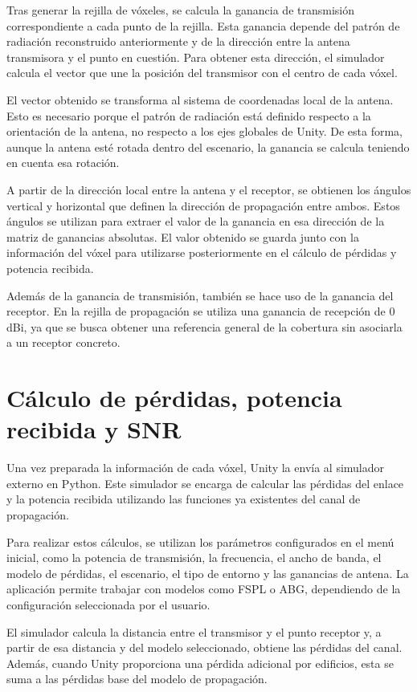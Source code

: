 Tras generar la rejilla de vóxeles, se calcula la ganancia de transmisión correspondiente a cada punto de la rejilla. Esta ganancia depende del patrón de radiación reconstruido anteriormente y de la dirección entre la antena transmisora y el punto en cuestión. Para obtener esta dirección, el simulador calcula el vector que une la posición del transmisor con el centro de cada vóxel.

El vector obtenido se transforma al sistema de coordenadas local de la antena. Esto es necesario porque el patrón de radiación está definido respecto a la orientación de la antena, no respecto a los ejes globales de Unity. De esta forma, aunque la antena esté rotada dentro del escenario, la ganancia se calcula teniendo en cuenta esa rotación.

A partir de la dirección local entre la antena y el receptor, se obtienen los ángulos vertical y horizontal que definen la dirección de propagación entre ambos. Estos ángulos se utilizan para extraer el valor de la ganancia en esa dirección de la matriz de ganancias absolutas. El valor obtenido se guarda junto con la información del vóxel para utilizarse posteriormente en el cálculo de pérdidas y potencia recibida.

Además de la ganancia de transmisión, también se hace uso de la ganancia del receptor. En la rejilla de propagación se utiliza una ganancia de recepción de 0 dBi, ya que se busca obtener una referencia general de la cobertura sin asociarla a un receptor concreto.


\section{Cálculo de pérdidas, potencia recibida y SNR}

Una vez preparada la información de cada vóxel, Unity la envía al simulador externo en Python. Este simulador se encarga de calcular las pérdidas del enlace y la potencia recibida utilizando las funciones ya existentes del canal de propagación.

Para realizar estos cálculos, se utilizan los parámetros configurados en el menú inicial, como la potencia de transmisión, la frecuencia, el ancho de banda, el modelo de pérdidas, el escenario, el tipo de entorno y las ganancias de antena. La aplicación permite trabajar con modelos como FSPL o ABG, dependiendo de la configuración seleccionada por el usuario.

El simulador calcula la distancia entre el transmisor y el punto receptor y, a partir de esa distancia y del modelo seleccionado, obtiene las pérdidas del canal. Además, cuando Unity proporciona una pérdida adicional por edificios, esta se suma a las pérdidas base del modelo de propagación.

